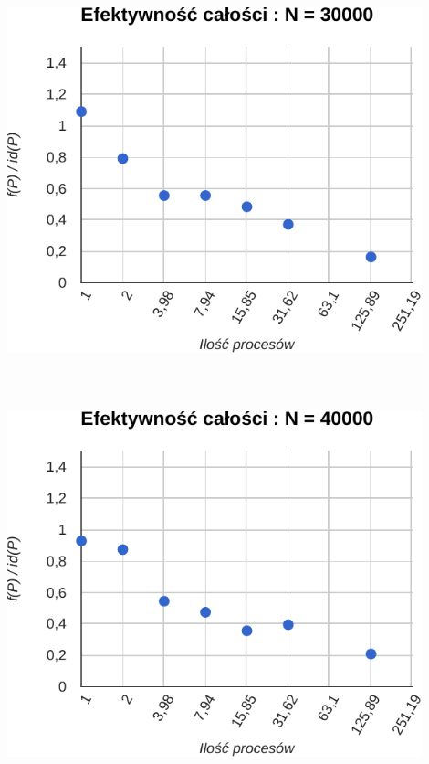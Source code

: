 \documentclass[paper=a4, fontsize=11pt]{scrartcl}	%
\numberwithin{equation}{section}		%
\numberwithin{figure}{section}			%
\numberwithin{table}{section}				%
\begin{document}
\includegraphics[width=120mm]{report/eff-30000.pdf} \\ \ \\ \ \\ \ \\

\includegraphics[width=120mm]{report/eff-40000.pdf} \\ \ \\ \ \\ \ \\
\end{document}
